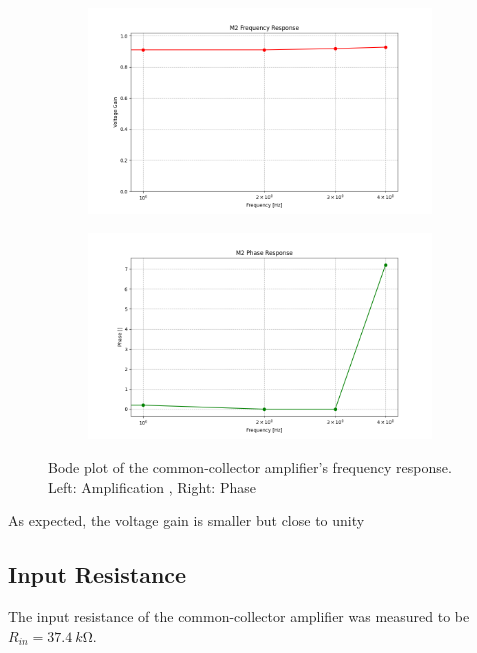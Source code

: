 \documentclass[12pt,a4paper]{article}
\begin{document}
\begin{figure}[H]
    \centering
    \begin{subfigure}[b]{0.48\linewidth}
        \centering
        \includegraphics[width=\linewidth]{m2_frequency_response_A.png}
    \end{subfigure}\hfill
    \begin{subfigure}[b]{0.48\linewidth}
        \centering
        \includegraphics[width=\linewidth]{m2_phase_response.png}
    \end{subfigure}
    \caption{Bode plot of the common-collector amplifier's frequency response. Left: Amplification , Right: Phase}
    \label{fig:bode_plot_m2}
\end{figure}

As expected, the voltage gain is smaller but close to unity

\subsection{Input Resistance}
The input resistance of the common-collector amplifier was measured to be $R_{in} = \SI{37.4}{k\ohm}$.
\end{document}
